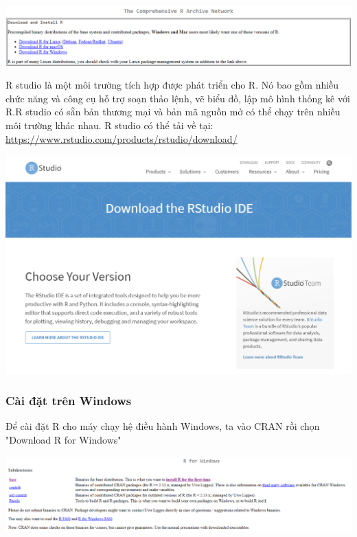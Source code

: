 \documentclass{standalone} %
\begin{document}
        \begin{center}
            \includegraphics[width=\textwidth,height=\textheight,keepaspectratio]{Pictures/CRAN_download_web_page.png}
        \end{center}
        
        R studio là một môi trường tích hợp được phát triển cho R. Nó bao gồm nhiều chức năng và công cụ hỗ trợ soạn thảo lệnh, vẽ biểu đồ, lập mô hình thống kê với R.R studio có sẵn bản thương mại và bản mã nguồn mở có thể chạy trên nhiều môi trường khác nhau. R studio có thể tải về tại: \href{rstudio.com}{https://www.rstudio.com/products/rstudio/download/}
        
        \begin{center}
            \includegraphics[width=\textwidth, height=\textheight, keepaspectratio]{Pictures/R_studio_1.png}
        \end{center}
        
        \subsubsection{Cài đặt trên Windows}
        
        Để cài đặt R cho máy chạy hệ điều hành Windows, ta vào CRAN rồi chọn "Download R for Windows"
        
        \begin{center}
            \includegraphics[width=\textwidth,height=\textheight,keepaspectratio]{Pictures/Download_for _win_1.png}
        \end{center}
        
\end{document}
